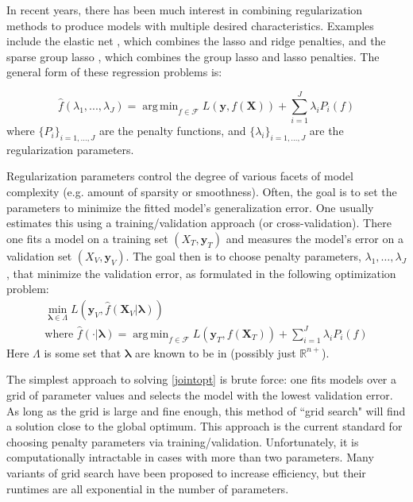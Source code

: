 \documentclass[10pt,letterpaper]{article}
\DeclareMathOperator*{\argmin}{arg\,min}
\begin{document}
In recent years, there has been much interest in combining regularization methods to produce models with multiple desired characteristics. Examples include the elastic net \citep{zou2003regression}, which combines the lasso and ridge penalties, and the sparse group lasso \citep{simon2013sparse}, which combines the group lasso and lasso penalties. The general form of these regression problems is:

\begin{equation} \label {eq:basic}
\hat f(\lambda_1, ..., \lambda_J) = \argmin_{f\in\mathcal{F}} L(\boldsymbol{y}, f (\boldsymbol{X})) + \sum\limits_{i=1}^J \lambda_i P_i(f)
\end{equation}
where $\{P_i\}_{i=1, ..., J}$ are the penalty functions, and $\{\lambda_i\}_{i=1, ..., J}$ are the regularization parameters.

Regularization parameters control the degree of various facets of model complexity (e.g. amount of sparsity or smoothness). Often, the goal is to set the parameters to minimize the fitted model's generalization error. One usually estimates this using a training/validation approach (or cross-validation). There one fits a model on a training set $(X_T, \boldsymbol y_T)$ and measures the model's error on a validation set $(X_V, \boldsymbol y_V)$. The goal then is to choose penalty parameters, $\lambda_1, \ldots, \lambda_J$, that minimize the validation error, as formulated in the following optimization problem:
\begin{equation}
\begin{array}{c}
\min_{\boldsymbol{\lambda} \in \Lambda} L(\boldsymbol{y}_V, \hat f (\boldsymbol{X}_V | \boldsymbol{\lambda})) \\
\text{where } \hat f(\cdot | \boldsymbol{\lambda}) = \argmin_{f\in\mathcal{F}} L(\boldsymbol{y}_T, f (\boldsymbol{X}_T)) + \sum\limits_{i=1}^J \lambda_i P_i(f)
\end{array}
\label{jointopt}
\end{equation}
Here $\Lambda$ is some set that $\boldsymbol{\lambda}$ are known to be in (possibly just $\mathbb{R}^{n+}$).

The simplest approach to solving \eqref{jointopt} is brute force: one fits models over a grid of parameter values and selects the model with the lowest validation error. As long as the grid is large and fine enough, this method of ``grid search" will find a solution close to the global optimum. This approach is the current standard for choosing penalty parameters via training/validation. Unfortunately, it is computationally intractable in cases with more than two parameters. Many variants of grid search have been proposed to increase efficiency, but their runtimes are all exponential in the number of parameters.
\end{document}
